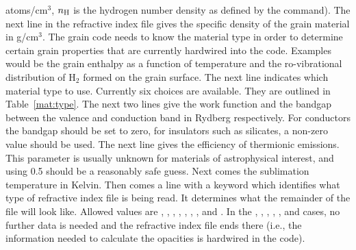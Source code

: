 atoms/cm$^3$, $n_{\rm H}$ is the hydrogen number density as defined by the
 command). The next line in the refractive index file gives
the specific density of the grain material in g/cm$^3$. The grain code needs
to know the material type in order to determine certain grain properties that
are currently hardwired into the code. Examples would be the grain enthalpy as
a function of temperature and the ro-vibrational distribution of H$_2$ formed
on the grain surface. The next line indicates which material type to use.
Currently six choices are available. They are outlined in
Table~\ref{mat:type}. The next two lines give the work function and the
bandgap between the valence and conduction band in Rydberg respectively. For
conductors the bandgap should be set to zero, for insulators such as
silicates, a non-zero value should be used. The next line gives the efficiency
of thermionic emissions. This parameter is usually unknown for materials of
astrophysical interest, and using 0.5 should be a reasonably safe guess. Next
comes the sublimation temperature in Kelvin. Then comes a line with a keyword
which identifies what type of refractive index file is being read. It
determines what the remainder of the file will look like. Allowed values are
, , ,
, , , ,
and . In the , ,
, , , and 
cases, no further data is needed and the refractive index file ends there
(i.e., the information needed to calculate the opacities is hardwired in the
code).

